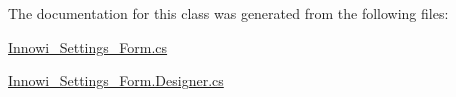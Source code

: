 The documentation for this class was generated from the following files\+:\begin{DoxyCompactItemize}
\item 
\mbox{\hyperlink{_innowi___settings___form_8cs}{Innowi\+\_\+\+Settings\+\_\+\+Form.\+cs}}\item 
\mbox{\hyperlink{_innowi___settings___form_8_designer_8cs}{Innowi\+\_\+\+Settings\+\_\+\+Form.\+Designer.\+cs}}\end{DoxyCompactItemize}
